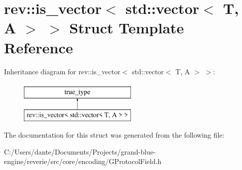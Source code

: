 \hypertarget{structrev_1_1is__vector_3_01std_1_1vector_3_01_t_00_01_a_01_4_01_4}{}\section{rev\+::is\+\_\+vector$<$ std\+::vector$<$ T, A $>$ $>$ Struct Template Reference}
\label{structrev_1_1is__vector_3_01std_1_1vector_3_01_t_00_01_a_01_4_01_4}
Inheritance diagram for rev\+::is\+\_\+vector$<$ std\+::vector$<$ T, A $>$ $>$\+:\begin{figure}[H]
\begin{center}
\leavevmode
\includegraphics[height=2.000000cm]{structrev_1_1is__vector_3_01std_1_1vector_3_01_t_00_01_a_01_4_01_4}
\end{center}
\end{figure}


The documentation for this struct was generated from the following file\+:\begin{DoxyCompactItemize}
\item 
C\+:/\+Users/dante/\+Documents/\+Projects/grand-\/blue-\/engine/reverie/src/core/encoding/G\+Protocol\+Field.\+h\end{DoxyCompactItemize}
